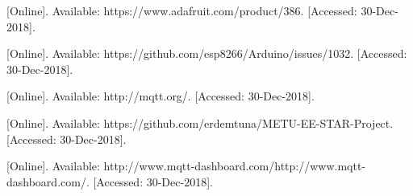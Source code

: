 \documentclass[a4paper,12pt]{article}
\begin{document}
\newpage
\begin{thebibliography}{}
	
	
	  [Online].
	 Available: https://www.adafruit.com/product/386.
	 [Accessed: 30-Dec-2018].
	 
	  [Online].
	 Available: https://github.com/esp8266/Arduino/issues/1032.
	 [Accessed: 30-Dec-2018].
	 
	  [Online].
	Available: http://mqtt.org/.
	[Accessed: 30-Dec-2018].
	 
	  [Online].
	Available: https://github.com/erdemtuna/METU-EE-STAR-Project.
	[Accessed: 30-Dec-2018].
	
	  [Online].
Available: http://www.mqtt-dashboard.com/http://www.mqtt-dashboard.com/.
[Accessed: 30-Dec-2018].


		
\end{thebibliography}
\end{document}
